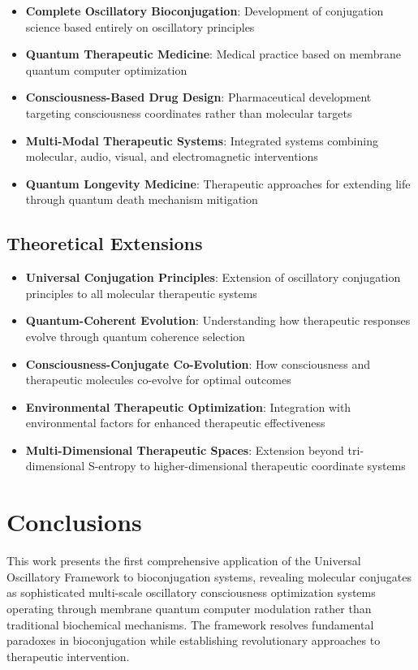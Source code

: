 \documentclass[12pt,a4paper]{article}
\begin{document}
\begin{itemize}
\item \textbf{Complete Oscillatory Bioconjugation}: Development of conjugation science based entirely on oscillatory principles
\item \textbf{Quantum Therapeutic Medicine}: Medical practice based on membrane quantum computer optimization
\item \textbf{Consciousness-Based Drug Design}: Pharmaceutical development targeting consciousness coordinates rather than molecular targets
\item \textbf{Multi-Modal Therapeutic Systems}: Integrated systems combining molecular, audio, visual, and electromagnetic interventions
\item \textbf{Quantum Longevity Medicine}: Therapeutic approaches for extending life through quantum death mechanism mitigation
\end{itemize}

\subsection{Theoretical Extensions}

\begin{itemize}
\item \textbf{Universal Conjugation Principles}: Extension of oscillatory conjugation principles to all molecular therapeutic systems
\item \textbf{Quantum-Coherent Evolution}: Understanding how therapeutic responses evolve through quantum coherence selection
\item \textbf{Consciousness-Conjugate Co-Evolution}: How consciousness and therapeutic molecules co-evolve for optimal outcomes
\item \textbf{Environmental Therapeutic Optimization}: Integration with environmental factors for enhanced therapeutic effectiveness
\item \textbf{Multi-Dimensional Therapeutic Spaces}: Extension beyond tri-dimensional S-entropy to higher-dimensional therapeutic coordinate systems
\end{itemize}

\section{Conclusions}

This work presents the first comprehensive application of the Universal Oscillatory Framework to bioconjugation systems, revealing molecular conjugates as sophisticated multi-scale oscillatory consciousness optimization systems operating through membrane quantum computer modulation rather than traditional biochemical mechanisms. The framework resolves fundamental paradoxes in bioconjugation while establishing revolutionary approaches to therapeutic intervention.
\end{document}
